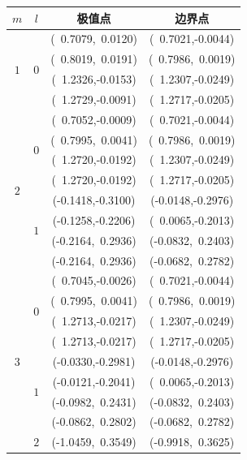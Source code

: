 \documentclass{beamer}
\begin{document}
	\newcommand{\pos}[2]{(#1,#2)}
	\begin{frame}
		\tiny \centering
		\begin{tabular}{cccc}
			\textrm{$m$}&\textrm{$l$}&\textrm{极值点}&\textrm{边界点}\\
			\hline
			\multirow{4}{*}{$1$}& \multirow{4}{*}{$0$} & \pos{\ 0.7079}{\ 0.0120} & \pos{\ 0.7021}{-0.0044} \\
			& & \pos{\ 0.8019}{\ 0.0191} & \pos{\ 0.7986}{\ 0.0019} \\
			& & \pos{\ 1.2326}{-0.0153} & \pos{\ 1.2307}{-0.0249} \\
			& & \pos{\ 1.2729}{-0.0091} & \pos{\ 1.2717}{-0.0205} \\
			\hline
			\multirow{8}{*}{$2$}& \multirow{4}{*}{$0$} & \pos{\ 0.7052}{-0.0009} & \pos{\ 0.7021}{-0.0044} \\
			& & \pos{\ 0.7995}{\ 0.0041} & \pos{\ 0.7986}{\ 0.0019} \\
			& & \pos{\ 1.2720}{-0.0192} & \pos{\ 1.2307}{-0.0249} \\
			& & \pos{\ 1.2720}{-0.0192} & \pos{\ 1.2717}{-0.0205} \\ \cline{2-4}
			& \multirow{4}{*}{$1$} & \pos{-0.1418}{-0.3100} & \pos{-0.0148}{-0.2976} \\
			& & \pos{-0.1258}{-0.2206} & \pos{\ 0.0065}{-0.2013} \\
			& & \pos{-0.2164}{\ 0.2936} & \pos{-0.0832}{\ 0.2403} \\
			& & \pos{-0.2164}{\ 0.2936} & \pos{-0.0682}{\ 0.2782} \\
			\hline
			\multirow{12}{*}{$3$}& \multirow{4}{*}{$0$} & \pos{\ 0.7045}{-0.0026} & \pos{\ 0.7021}{-0.0044} \\
			& & \pos{\ 0.7995}{\ 0.0041} & \pos{\ 0.7986}{\ 0.0019} \\
			& & \pos{\ 1.2713}{-0.0217} & \pos{\ 1.2307}{-0.0249} \\
			& & \pos{\ 1.2713}{-0.0217} & \pos{\ 1.2717}{-0.0205} \\ \cline{2-4}
			& \multirow{4}{*}{$1$} & \pos{-0.0330}{-0.2981} & \pos{-0.0148}{-0.2976} \\
			& & \pos{-0.0121}{-0.2041} & \pos{\ 0.0065}{-0.2013} \\
			& & \pos{-0.0982}{\ 0.2431} & \pos{-0.0832}{\ 0.2403} \\
			& & \pos{-0.0862}{\ 0.2802} & \pos{-0.0682}{\ 0.2782} \\ \cline{2-4}
			& \multirow{4}{*}{$2$} & \pos{-1.0459}{\ 0.3549} & \pos{-0.9918}{\ 0.3625} \\

\end{tabular}
\end{frame}
\end{document}
